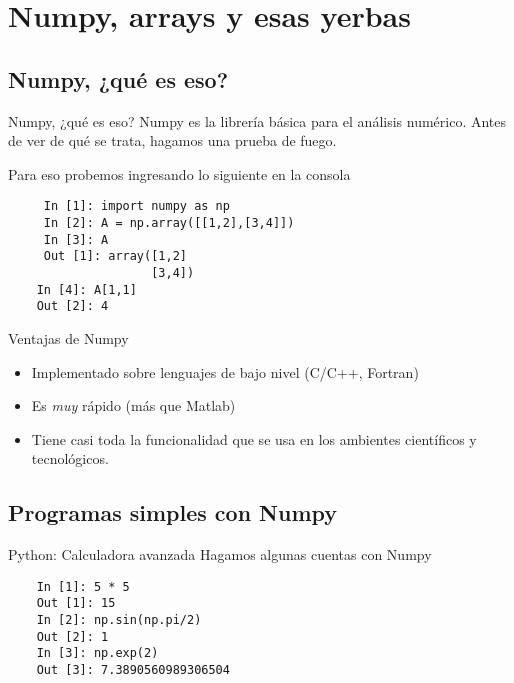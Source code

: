 \documentclass{beamer}
\begin{document}
\section{Numpy, arrays y esas yerbas}

\subsection{Numpy, ¿qué es eso?}

\begin{frame}[fragile]{Numpy, ¿qué es eso?}
    Numpy es la librería básica para el análisis numérico. Antes de ver de qué se trata, hagamos una prueba de fuego.

Para eso probemos ingresando lo siguiente en la consola
    \begin{verbatim}
     In [1]: import numpy as np
     In [2]: A = np.array([[1,2],[3,4]])
     In [3]: A
     Out [1]: array([1,2]
                    [3,4])
    In [4]: A[1,1]
    Out [2]: 4
    \end{verbatim}
\end{frame}

\begin{frame}{Ventajas de Numpy}
    \begin{itemize}
    \item Implementado sobre lenguajes de bajo nivel (C/C++, Fortran)
    \item Es \emph{muy} rápido (más que Matlab)
    \item Tiene casi toda la funcionalidad que se usa en los ambientes científicos y tecnológicos.
    \end{itemize}
\end{frame}

\subsection{Programas simples con Numpy}


\begin{frame}[fragile]{Python: Calculadora avanzada}
    Hagamos algunas cuentas con Numpy
    \begin{verbatim}
    In [1]: 5 * 5
    Out [1]: 15
    In [2]: np.sin(np.pi/2)
    Out [2]: 1
    In [3]: np.exp(2)
    Out [3]: 7.3890560989306504
    \end{verbatim}
\end{frame}
\end{document}
